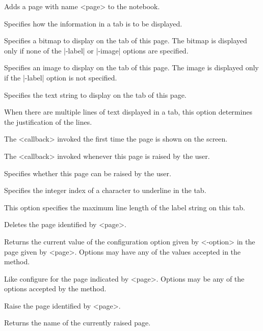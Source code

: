 \vskip5pt

\begin{enum}{1cm}

Adds a page with name <page> to the notebook.

Specifies how the information in a tab is to be displayed.

Specifies a bitmap to display on the tab of this page. The bitmap is displayed only if none of the |-label| or
|-image| options are specified. 

Specifies an image to display on the tab of this page. The image is displayed only if the |-label| option is not
specified. 

Specifies the text string to display on the tab of this page. 

When there are multiple lines of text displayed in a tab, this option determines the justification of the lines.

The <callback> invoked the first time the page is shown on the screen.

The <callback> invoked whenever this page is raised by the user. 

Specifies whether this page can be raised by the user.

Specifies the integer index of a character to underline in the tab.

This option specifies the maximum line length of the label string on this tab.

Deletes the page identified by <page>. 

Returns the current value of the configuration option given by <-option> in the page given by <page>. Options may
have any of the values accepted in the  method. 

Like configure for the page indicated by <page>. Options may be any of the options accepted by the
  method. 

Raise the page identified by <page>. 

Returns the name of the currently raised page. 

\end{enum}

